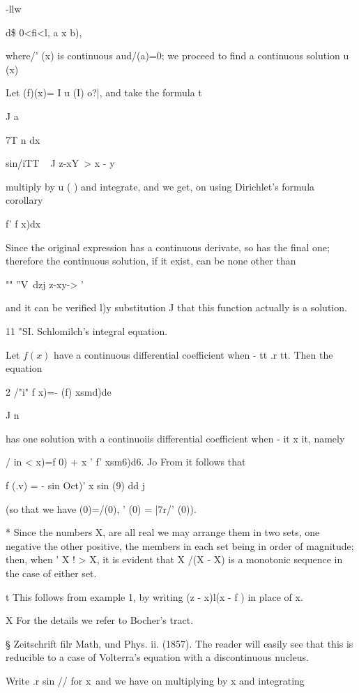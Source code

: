 {  -llw

d\$ 0<fi<l, a x b),

where/' (x) is continuous aud/(a)=0; we proceed to find a continuous
solution u (x)

Let (f)(x)= I u (I) o?|, and take the formula t

J a

7T n dx

sin/iTT ~ J z-xY~> x - y

multiply by u ( ) and integrate, and we get, on using Dirichlet's
formula  corollary\

  f' f x)dx

Since the original expression has a continuous derivate, so has the
final one; therefore the continuous solution, if it exist, can be
none other than

"" ''V~dzj z-xy-> '

and it can be verified l)y substitution J that this function actually
is a solution.

11 "SI. Schlomilch's integral equation.

Let $f(x)$ have a continuous differential coefficient when - tt .r tt.
Then the equation

2 /"i" f x)=- (f) xsmd)de

  J n

has one solution with a continuoiis differential coefficient when - it
x it, namely

/ in < x)=f 0) + x ' f' xsm6)d6. Jo From it follows that

f (.v) = - sin Oct)' x sin (9) dd j

(so that we have (0)=/(0), ' (0) = |7r/' (0)).

* Since the numbers X, are all real we may arrange them in two sets,
one negative the other positive, the members in each set being in
order of magnitude; then, when ' X ! > X, it is evident that X /(X -
X) is a monotonic sequence in the case of either set.

t This follows from example 1, by writing (z - x)l(x - f ) in
place of x.

X For the details we refer to Bocher's tract.

§ Zeitschrift filr Math, und Phys. ii. (1857). The reader will easily
see that this is reducible to a case of Volterra's equation with a
discontinuous nucleus.

%
%

Write .r sin // for x\ and we have on multiplying by x and integrating

}

